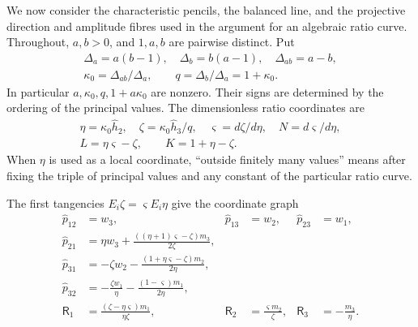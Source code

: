 \documentclass[11pt,a4paper]{article}
\numberwithin{equation}{section}
\theoremstyle{plain}
\theoremstyle{definition}
\theoremstyle{remark}
\begin{document}
We now consider the characteristic pencils, the balanced line, and the projective direction
and amplitude fibres used in the argument for an algebraic ratio curve.  Throughout,
\(a,b>0\), and \(1,a,b\) are pairwise distinct.  Put
\[
 \begin{gathered}
 \Delta_a=a(b-1),\quad \Delta_b=b(a-1),\quad \Delta_{ab}=a-b,\\
 \kappa_0 =\Delta_{ab}/\Delta_a,\qquad q=\Delta_b/\Delta_a=1+\kappa_0 .
 \end{gathered}
\]
In particular \(a,\kappa_0 ,q,1+a\kappa_0 \) are nonzero.  Their signs are determined by the ordering of the principal values.
The dimensionless ratio coordinates are
\[
 \begin{gathered}
 \eta =\kappa_0 \widehat h_2 ,\quad \zeta =\kappa_0 \widehat h_3 /q,\quad \varsigma =d\zeta /d\eta ,\quad N=d\varsigma /d\eta ,\\
 L=\eta \varsigma -\zeta ,\qquad K=1+\eta -\zeta .
 \end{gathered}
\]
When \(\eta \) is used as a local coordinate, ``outside finitely many values''
means after fixing the triple of principal values and any constant of the particular
ratio curve.  

The first tangencies $E_i\zeta =\varsigma  E_i\eta $ give the coordinate graph
\begin{equation}\label{r3:directioncoordinates}
\begin{aligned}
 \widehat p_{12}&=w_3,&\widehat p_{13}&=w_2,&\widehat p_{23}&=w_1,\\
 \widehat p_{21}&=\eta w_3+\frac{((\eta +1)\varsigma -\zeta )m_3}{2\zeta },\\
 \widehat p_{31}&=-\zeta w_2-\frac{(1+\eta \varsigma -\zeta )m_2}{2\eta },\\
 \widehat p_{32}&=-\frac{\zeta w_1}{\eta }-\frac{(1-\varsigma )m_1}{2\eta },\\
 \mathsf R_1&=\frac{(\zeta -\eta \varsigma )m_1}{\eta \zeta },&
 \mathsf R_2&=\frac{\varsigma m_2}{\zeta },&\mathsf R_3&=-\frac{m_3}{\eta }.
\end{aligned}
\end{equation}
\end{document}

